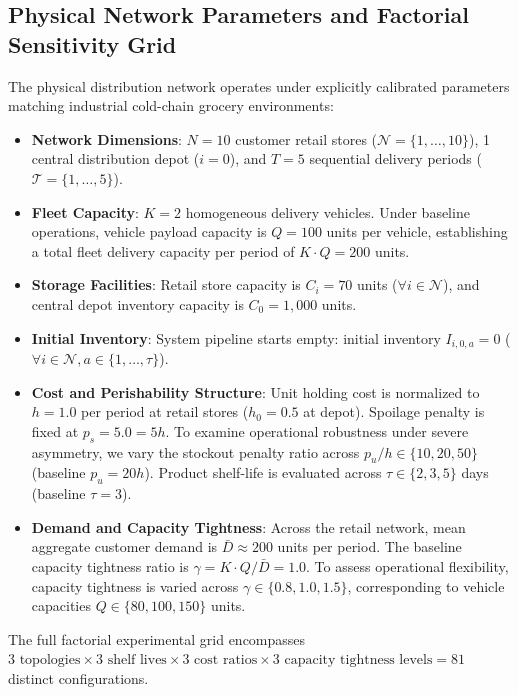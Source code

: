 \documentclass[11pt,a4paper]{article}
\theoremstyle{definition}
\theoremstyle{remark}
\begin{document}
\subsection{Physical Network Parameters and Factorial Sensitivity Grid}
\label{subsec:physical_params}
The physical distribution network operates under explicitly calibrated parameters matching industrial cold-chain grocery environments:
\begin{itemize}[leftmargin=*]
    \item \textbf{Network Dimensions}: $N = 10$ customer retail stores ($\mathcal{N} = \{1, \dots, 10\}$), 1 central distribution depot ($i = 0$), and $T = 5$ sequential delivery periods ($\mathcal{T} = \{1, \dots, 5\}$).
    \item \textbf{Fleet Capacity}: $K = 2$ homogeneous delivery vehicles. Under baseline operations, vehicle payload capacity is $Q = 100$ units per vehicle, establishing a total fleet delivery capacity per period of $K \cdot Q = 200$ units.
    \item \textbf{Storage Facilities}: Retail store capacity is $C_i = 70$ units ($\forall i \in \mathcal{N}$), and central depot inventory capacity is $C_0 = 1{,}000$ units.
    \item \textbf{Initial Inventory}: System pipeline starts empty: initial inventory $I_{i,0,a} = 0$ ($\forall i \in \mathcal{N}, a \in \{1, \dots, \tau\}$).
    \item \textbf{Cost and Perishability Structure}: Unit holding cost is normalized to $h = 1.0$ per period at retail stores ($h_0 = 0.5$ at depot). Spoilage penalty is fixed at $p_s = 5.0 = 5h$. To examine operational robustness under severe asymmetry, we vary the stockout penalty ratio across $p_u / h \in \{10, 20, 50\}$ (baseline $p_u = 20h$). Product shelf-life is evaluated across $\tau \in \{2, 3, 5\}$ days (baseline $\tau = 3$).
    \item \textbf{Demand and Capacity Tightness}: Across the retail network, mean aggregate customer demand is $\bar{D} \approx 200$ units per period. The baseline capacity tightness ratio is $\gamma = K \cdot Q / \bar{D} = 1.0$. To assess operational flexibility, capacity tightness is varied across $\gamma \in \{0.8, 1.0, 1.5\}$, corresponding to vehicle capacities $Q \in \{80, 100, 150\}$ units.
\end{itemize}
The full factorial experimental grid encompasses $3 \text{ topologies} \times 3 \text{ shelf lives} \times 3 \text{ cost ratios} \times 3 \text{ capacity tightness levels} = 81$ distinct configurations.
\end{document}
